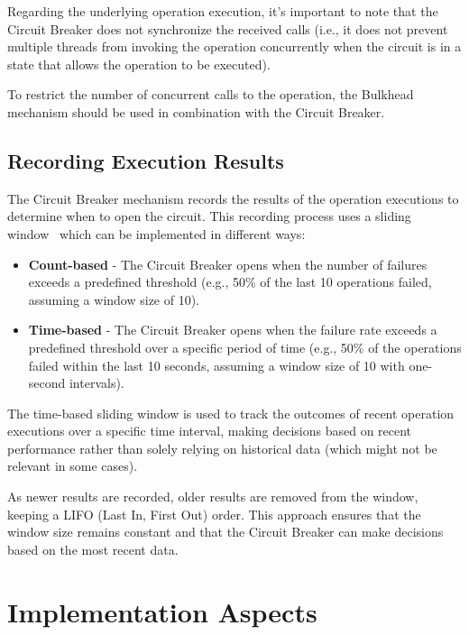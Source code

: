 Regarding the underlying operation execution,
it's important to note that the Circuit Breaker does not synchronize the received calls (i.e., it does not prevent multiple threads from invoking the operation concurrently when the circuit is in a state that allows the operation to be executed).

To restrict the number of concurrent calls to the operation, the Bulkhead~\cite{microsoft-bulkhead-pattern} mechanism should be used in combination with the Circuit Breaker.

\subsection{Recording Execution Results}\label{subsec:cbreaker-recording-execution-results}

The Circuit Breaker mechanism records the results of the operation executions to determine when to open the circuit.
This recording process uses a sliding window~\cite{sliding-window} which can be implemented in different ways:

\begin{itemize}
    \item \textbf{Count-based} -
    The Circuit Breaker opens when the number of failures exceeds a predefined threshold
    (e.g., 50\% of the last 10 operations failed, assuming a window size of 10).
    \item \textbf{Time-based} -
    The Circuit Breaker opens when the failure rate exceeds a predefined threshold over a specific period of time
    (e.g., 50\% of the operations failed within the last 10 seconds,
    assuming a window size of 10 with one-second intervals).
\end{itemize}

The time-based sliding window is used
to track the outcomes of recent operation executions over a specific time interval,
making decisions based on recent performance rather than solely relying on historical data
(which might not be relevant in some cases).

As newer results are recorded, older results are removed from the window, keeping a
LIFO (Last In, First Out) order.
This approach ensures that the window size remains constant and that the Circuit Breaker can make decisions based on the most recent data.


\section{Implementation Aspects}\label{sec:cbreaker-implementation-aspects}

